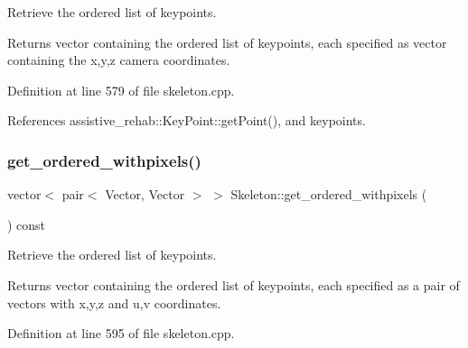 Retrieve the ordered list of keypoints. 

\begin{DoxyReturn}{Returns}
vector containing the ordered list of keypoints, each specified as vector containing the x,y,z camera coordinates. 
\end{DoxyReturn}


Definition at line 579 of file skeleton.\+cpp.


\begin{DoxyCode}{0}

\end{DoxyCode}


References assistive\+\_\+rehab\+::\+Key\+Point\+::get\+Point(), and keypoints.

\mbox{\label{classassistive__rehab_1_1Skeleton_a270506cde494cb4261c7892edb46ce53}} 
\subsubsection{\texorpdfstring{get\_ordered\_withpixels()}{get\_ordered\_withpixels()}}
{\footnotesize\ttfamily vector$<$ pair$<$ Vector, Vector $>$ $>$ Skeleton\+::get\+\_\+ordered\+\_\+withpixels (\begin{DoxyParamCaption}{ }\end{DoxyParamCaption}) const\hspace{0.3cm}{\ttfamily [virtual]}}



Retrieve the ordered list of keypoints. 

\begin{DoxyReturn}{Returns}
vector containing the ordered list of keypoints, each specified as a pair of vectors with x,y,z and u,v coordinates. 
\end{DoxyReturn}


Definition at line 595 of file skeleton.\+cpp.


\begin{DoxyCode}{0}

\end{DoxyCode}


